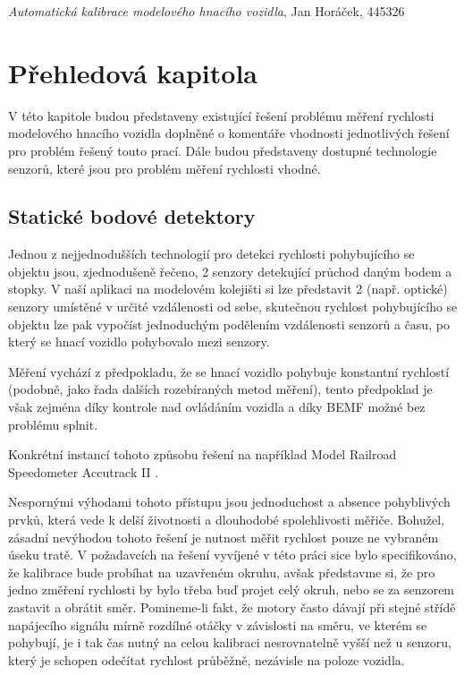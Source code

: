 \documentclass[12pt,a4paper]{article}
\begin{document}
\pagestyle{empty}
\noindent

\textit{Automatická kalibrace modelového hnacího vozidla}, Jan Horáček, 445326

\section{Přehledová kapitola}

V této kapitole budou představeny existující řešení problému měření rychlosti
modelového hnacího vozidla doplněné o komentáře vhodnosti jednotlivých řešení
pro problém řešený touto prací. Dále budou představeny dostupné technologie
senzorů, které jsou pro problém měření rychlosti vhodné.

\subsection{Statické bodové detektory}

Jednou z nejjednodušších technologií pro detekci rychlosti pohybujícího se
objektu jsou, zjednodušeně řečeno, 2 senzory detekující průchod daným bodem
a stopky. V naší aplikaci na modelovém kolejišti si lze představit 2
(např. optické) senzory umístěné v určité vzdálenosti od sebe, skutečnou
rychlost pohybujícího se objektu lze pak vypočíst jednoduchým podělením
vzdálenosti senzorů a času, po který se hnací vozidlo pohybovalo mezi senzory.

Měření vychází z předpokladu, že se hnací vozidlo pohybuje konstantní
rychlostí (podobně, jako řada dalších rozebíraných metod měření), tento
předpoklad je však zejména díky kontrole nad ovládáním vozidla a díky BEMF
možné bez problému splnit.

Konkrétní instancí tohoto způsobu řešení na například Model Railroad Speedometer
Accutrack II \cite{accutrackII}.

Nespornými výhodami tohoto přístupu jsou jednoduchost a absence pohyblivých
prvků, která vede k delší životnosti a dlouhodobé spolehlivosti měřiče. Bohužel,
zásadní nevýhodou tohoto řešení je nutnost měřit rychlost pouze ne vybraném
úseku tratě. V požadavcích na řešení vyvíjené v této práci sice bylo specifikováno,
že kalibrace bude probíhat na uzavřeném okruhu, avšak představme si, že pro
jedno změření rychlosti by bylo třeba buď projet celý okruh, nebo se za senzorem
zastavit a obrátit směr. Pomineme-li fakt, že motory často dávají při stejné
střídě napájecího signálu mírně rozdílné otáčky v závislosti na směru, ve
kterém se pohybují, je i tak čas nutný na celou kalibraci nesrovnatelně vyšší
než u senzoru, který je schopen odečítat rychlost průběžně, nezávisle na
poloze vozidla.
\end{document}
